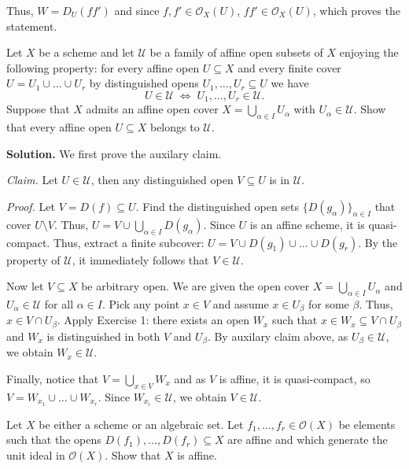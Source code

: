 \documentclass{template}
\begin{document}
Thus, $W=D_U(ff')$ and since $f,f' \in \mathcal{O}_X(U)$, $ff' \in \mathcal{O}_X(U)$,
which proves the statement.

\begin{problem}
    Let $X$ be a scheme and let $\mathcal{U}$ be a family of affine open 
    subsets of $X$ enjoying the following property: for every affine open 
    $U \subseteq X$ and every finite cover $U = U_1 \cup \dots \cup U_r$
    by distinguished opens $U_1, \dots, U_r \subseteq U$ we have 
    \begin{equation*}
        U \in \mathcal{U} \; \Leftrightarrow \; U_1,\dots,U_r \in \mathcal{U}.
    \end{equation*}
    Suppose that $X$ admits an affine open cover $X = \bigcup_{\alpha \in I}U_{\alpha}$
    with $U_{\alpha} \in \mathcal{U}$. Show that every affine open $U \subseteq X$
    belongs to $\mathcal{U}$.
\end{problem}

\textbf{Solution.} We first prove the auxilary claim.

\textit{Claim.} Let $U \in \mathcal{U}$, then any distinguished open $V \subseteq U$ is in $\mathcal{U}$.

\textit{Proof.} Let $V=D(f) \subseteq U$. Find the distinguished
open sets $\{D(g_\alpha)\}_{\alpha \in I}$ that cover $U \setminus V$. 
Thus, $U = V \cup \bigcup_{\alpha \in I}D(g_{\alpha})$. Since $U$
is an affine scheme, it is quasi-compact. Thus, extract a finite subcover:
$U = V \cup D(g_1) \cup \dots \cup D(g_r)$. By the property of $\mathcal{U}$,
it immediately follows that $V \in \mathcal{U}$.

Now let $V \subseteq X$ be arbitrary open. We are given the open cover $X =
\bigcup_{\alpha \in I}U_{\alpha}$ and $U_{\alpha} \in \mathcal{U}$ for all
$\alpha \in I$. Pick any point $x \in V$ and assume $x \in U_{\beta}$ for some
$\beta$. Thus, $x \in V \cap U_{\beta}$. Apply Exercise 1: there exists
an open $W_x$ such that $x \in W_x \subseteq V \cap U_{\beta}$ and $W_x$
is distinguished in both $V$ and $U_{\beta}$. By auxilary claim above,
as $U_{\beta} \in \mathcal{U}$, we obtain $W_x \in \mathcal{U}$.

Finally, notice that $V = \bigcup_{x \in V}W_x$ and as $V$ is affine,
it is quasi-compact, so $V = W_{x_1} \cup \dots \cup W_{x_r}$. 
Since $W_{x_i} \in \mathcal{U}$, we obtain $V \in \mathcal{U}$.

\begin{problem}[Exercise 3]
    Let $X$ be either a scheme or an algebraic set. Let $f_1,\dots,f_r \in \mathcal{O}(X)$
    be elements such that the opens $D(f_1),\dots,D(f_r) \subseteq X$ are affine 
    and which generate the unit ideal in $\mathcal{O}(X)$. Show that $X$ is affine.
\end{problem}
\end{document}
